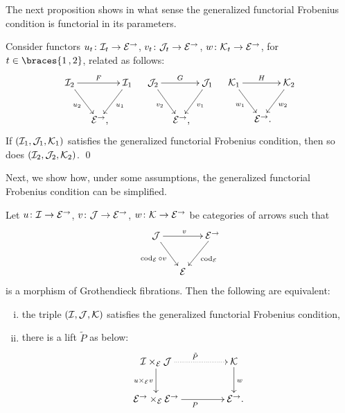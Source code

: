 \documentclass[reqno,10pt,a4paper,oneside,draft]{amsart}
\begin{document}
{{The next proposition shows in what sense the generalized functorial Frobenius condition is functorial in its parameters.

\begin{proposition} \label{generalized-uniform-frob-functorial}
Consider functors $u_t \co \cal{I}_t \to \cal{E}^\to$, $v_t \co \cal{J}_t \to \cal{E}^\to$, $w \co \cal{K}_t \to \cal{E}^\to$, for $t \in \braces{1\,, 2}$, related as follows:
\begin{align*}
\xymatrix@!C@C-1.5em{
  \cal{I}_2
  \ar[rr]^{F}
  \ar[dr]_{u_2}
&&
  \cal{I}_1
  \ar[dl]^{u_1}
\\&
  \catE^\to
\rlap{,}}
&&
\xymatrix@C-1.5em{
  \cal{J}_2
  \ar[rr]^-{G}
  \ar[dr]_{v_2}
&&
  \cal{J}_1
  \ar[dl]^{v_1}
\\&
  \catE^\to
\rlap{,}}
&&
\xymatrix@C-1.5em{
  \cal{K}_1
  \ar[rr]^-{H}
  \ar[dr]_{w_1}
&&
  \cal{K}_2
  \ar[dl]^{w_2}
\\&
  \catE^\to
\rlap{.}}
\end{align*}
If $(\cal{I}_1, \cal{J}_1, \cal{K}_1)$ satisfies the generalized functorial Frobenius condition, then so does $(\cal{I}_2, \cal{J}_2, \cal{K}_2)$.
\qed
\end{proposition}

Next, we show how, under some assumptions,  the generalized functorial Frobenius condition can be simplified.

\begin{proposition} \label{generalized-uniform-frob-nicer}
Let $u \co \cal{I} \to \cal{E}^\to$, $v \co \cal{J} \to \cal{E}^\to$, $w \co \cal{K} \to \cal{E}^\to$ be categories of arrows such that
\begin{equation} \label{uniform-frob:comprehension}
\begin{gathered}
\xymatrix@C-1em{
  \cal{J}
  \ar[rr]^{v}
  \ar[dr]_{\cod_{\cal{E}} \cc v}
&&
  \cal{E}^\to
  \ar[dl]^{\cod_{\cal{E}}}
\\&
  \cal{E}
}
\end{gathered}
\end{equation}
is a morphism of Grothendieck fibrations.
Then the following are equivalent:
\begin{enumerate}[(i)]
\item the triple $(\cal{I}, \cal{J}, \cal{K})$ satisfies the generalized functorial Frobenius condition,
\item there is a lift $\tilde{P}$ as below:
\begin{equation} \label{generalized-uniform-frob-nicer:lift}
\begin{gathered}
\xymatrix@C+2em{
  \cal{I} \times_{\cal{E}} \cal{J}
  \ar@{.>}[r]^{\tilde{P}}
  \ar[d]_{u \times_{\cal{E}} v}
&
  \cal{K}
  \ar[d]^{w}
\\
  \cal{E}^\to \times_{\cal{E}} \cal{E}^\to
  \ar[r]_{P}
&
  \cal{E}^\to
\rlap{.}}
\end{gathered}
\end{equation}
\end{enumerate}
\end{proposition}

}}
\end{document}
